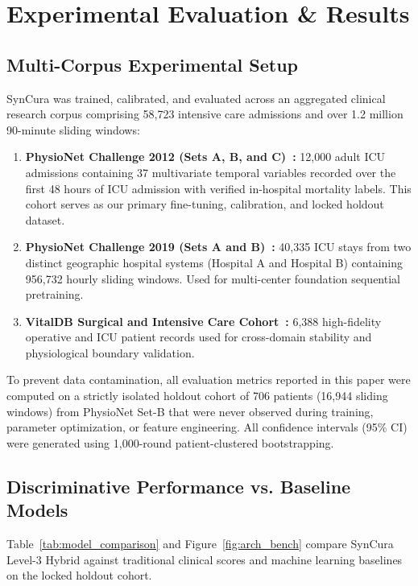 \documentclass[conference]{IEEEtran}
\begin{document}
\section{Experimental Evaluation \& Results}

\subsection{Multi-Corpus Experimental Setup}
SynCura was trained, calibrated, and evaluated across an aggregated clinical research corpus comprising 58,723 intensive care admissions and over 1.2 million 90-minute sliding windows:
\begin{enumerate}
    \item \textbf{PhysioNet Challenge 2012 (Sets A, B, and C)~\cite{physionet2012}:} 12,000 adult ICU admissions containing 37 multivariate temporal variables recorded over the first 48 hours of ICU admission with verified in-hospital mortality labels. This cohort serves as our primary fine-tuning, calibration, and locked holdout dataset.
    \item \textbf{PhysioNet Challenge 2019 (Sets A and B)~\cite{physionet2019}:} 40,335 ICU stays from two distinct geographic hospital systems (Hospital A and Hospital B) containing 956,732 hourly sliding windows. Used for multi-center foundation sequential pretraining.
    \item \textbf{VitalDB Surgical and Intensive Care Cohort~\cite{vitaldb}:} 6,388 high-fidelity operative and ICU patient records used for cross-domain stability and physiological boundary validation.
\end{enumerate}

To prevent data contamination, all evaluation metrics reported in this paper were computed on a strictly isolated holdout cohort of 706 patients (16,944 sliding windows) from PhysioNet Set-B that were never observed during training, parameter optimization, or feature engineering. All confidence intervals (95\% CI) were generated using 1,000-round patient-clustered bootstrapping.

\subsection{Discriminative Performance vs. Baseline Models}
Table~\ref{tab:model_comparison} and Figure~\ref{fig:arch_bench} compare SynCura Level-3 Hybrid against traditional clinical scores and machine learning baselines on the locked holdout cohort.
\end{document}
